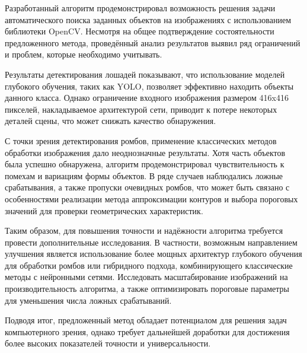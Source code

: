 
Разработанный алгоритм продемонстрировал возможность решения задачи автоматического поиска заданных объектов на изображениях с использованием библиотеки OpenCV. 
Несмотря на общее подтверждение состоятельности предложенного метода, 
проведённый анализ результатов выявил ряд ограничений и проблем, которые необходимо учитывать.

Результаты детектирования лошадей показывают, что использование моделей глубокого обучения, 
таких как YOLO, позволяет эффективно находить объекты данного класса. 
Однако ограничение входного изображения размером 416x416 пикселей, накладываемое архитектурой сети, 
приводит к потере некоторых деталей сцены, что может снижать качество обнаружения. 

С точки зрения детектирования ромбов, применение классических методов обработки изображения дало неоднозначные результаты. 
Хотя часть объектов была успешно обнаружена, алгоритм продемонстрировал чувствительность к помехам и вариациям формы объектов. 
В ряде случаев наблюдались ложные срабатывания, а также пропуски очевидных ромбов, 
что может быть связано с особенностями реализации метода аппроксимации контуров и выбора пороговых значений для проверки геометрических характеристик.

Таким образом, для повышения точности и надёжности алгоритма требуется провести дополнительные исследования. 
В частности, возможным направлением улучшения является использование более мощных архитектур глубокого обучения 
для обработки ромбов или гибридного подхода, комбинирующего классические методы с нейронными сетями. 
Исследовать масштабирование изображений на производительность алгоритма, 
а также оптимизировать пороговые параметры для уменьшения числа ложных срабатываний.

Подводя итог, предложенный метод обладает потенциалом для решения задач компьютерного зрения, 
однако требует дальнейшей доработки для достижения более высоких показателей точности и универсальности.

